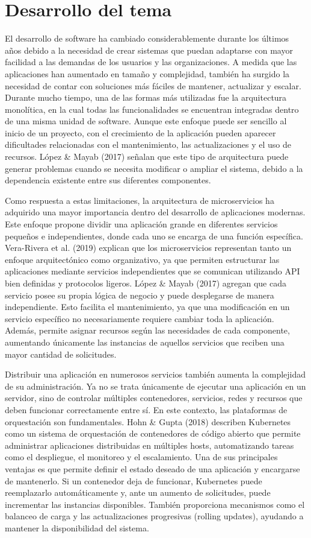 \documentclass[12pt,letterpaper]{article}
\begin{document}
\section*{ Desarrollo del tema}
El desarrollo de software ha cambiado considerablemente durante los últimos años debido a la necesidad de crear sistemas que puedan adaptarse con mayor facilidad a las demandas de los usuarios y las organizaciones. A medida que las aplicaciones han aumentado en tamaño y complejidad, también ha surgido la necesidad de contar con soluciones más fáciles de mantener, actualizar y escalar. Durante mucho tiempo, una de las formas más utilizadas fue la arquitectura monolítica, en la cual todas las funcionalidades se encuentran integradas dentro de una misma unidad de software. Aunque este enfoque puede ser sencillo al inicio de un proyecto, con el crecimiento de la aplicación pueden aparecer dificultades relacionadas con el mantenimiento, las actualizaciones y el uso de recursos. López \& Mayab (2017) señalan que este tipo de arquitectura puede generar problemas cuando se necesita modificar o ampliar el sistema, debido a la dependencia existente entre sus diferentes componentes.

Como respuesta a estas limitaciones, la arquitectura de microservicios ha adquirido una mayor importancia dentro del desarrollo de aplicaciones modernas. Este enfoque propone dividir una aplicación grande en diferentes servicios pequeños e independientes, donde cada uno se encarga de una función específica. Vera-Rivera et al. (2019) explican que los microservicios representan tanto un enfoque arquitectónico como organizativo, ya que permiten estructurar las aplicaciones mediante servicios independientes que se comunican utilizando API bien definidas y protocolos ligeros. López \& Mayab (2017) agregan que cada servicio posee su propia lógica de negocio y puede desplegarse de manera independiente. Esto facilita el mantenimiento, ya que una modificación en un servicio específico no necesariamente requiere cambiar toda la aplicación. Además, permite asignar recursos según las necesidades de cada componente, aumentando únicamente las instancias de aquellos servicios que reciben una mayor cantidad de solicitudes.

Distribuir una aplicación en numerosos servicios también aumenta la complejidad de su administración. Ya no se trata únicamente de ejecutar una aplicación en un servidor, sino de controlar múltiples contenedores, servicios, redes y recursos que deben funcionar correctamente entre sí. En este contexto, las plataformas de orquestación son fundamentales. Hohn \& Gupta (2018) describen Kubernetes como un sistema de orquestación de contenedores de código abierto que permite administrar aplicaciones distribuidas en múltiples hosts, automatizando tareas como el despliegue, el monitoreo y el escalamiento. Una de sus principales ventajas es que permite definir el estado deseado de una aplicación y encargarse de mantenerlo. Si un contenedor deja de funcionar, Kubernetes puede reemplazarlo automáticamente y, ante un aumento de solicitudes, puede incrementar las instancias disponibles. También proporciona mecanismos como el balanceo de carga y las actualizaciones progresivas (rolling updates), ayudando a mantener la disponibilidad del sistema.
\end{document}
